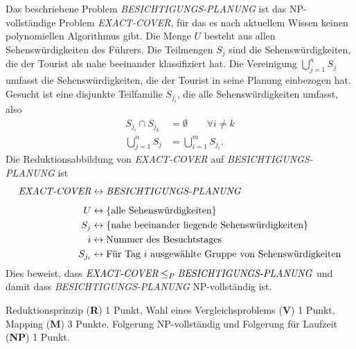 \begin{loesung}
Das beschriebene Problem {\em BESICHTIGUNGS-PLANUNG}
ist das NP-vollständige Problem {\em EXACT-COVER}, 
für das es nach aktuellem Wissen keinen polynomiellen Algorithmus gibt.
Die Menge $U$ besteht aus allen Sehenswürdigkeiten des Führers.
Die Teilmengen $S_j$ sind die Sehenswürdigkeiten, die der Tourist 
als nahe beeinander klassifiziert hat.
Die Vereinigung $\bigcup_{j=1}^n S_j$ umfasst die Sehenswürdigkeiten, die
der Tourist in seine Planung einbezogen hat.
Gesucht ist eine disjunkte Teilfamilie $S_{j_i}$, die alle Sehenswürdigkeiten
umfasst, also
\begin{align*}
S_{j_i}\cap S_{j_k}&=\emptyset \qquad \forall i\ne k
\\
\bigcup_{j=1}^n S_j &= \bigcup_{i=1}^m S_{j_i}.
\end{align*}
Die Reduktionsabbildung von {\em EXACT-COVER} auf 
{\em BESICHTIGUNGS-PLANUNG} ist
\begin{align*}
\text{\em EXACT-COVER}
&\leftrightarrow
\text{\em BESICHTIGUNGS-PLANUNG}
\\[5pt]
U&\leftrightarrow\{\text{alle Sehenswürdigkeiten}\}
\\
S_j&\leftrightarrow\{\text{nahe beeinander liegende Sehenswürdigkeiten}\}
\\
i&\leftrightarrow\text{Nummer des Besuchtstages}
\\
S_{j_i}&\leftrightarrow\text{Für Tag $i$ ausgewählte Gruppe von Sehenswürdigkeiten}
\end{align*}
Dies beweist, dass
$\text{\em EXACT-COVER}\le_{P}\text{\em BESICHTIGUNGS-PLANUNG}$
und damit dass {\em BESICHTIGUNGS-PLANUNG} NP-vollständig ist.
\end{loesung}

\begin{bewertung}
Reduktionsprinzip ({\bf R}) 1 Punkt,
Wahl eines Vergleichsproblems ({\bf V}) 1 Punkt,
Mapping ({\bf M}) 3 Punkte.
Folgerung NP-vollständig und Folgerung für Laufzeit ({\bf NP}) 1 Punkt.
\end{bewertung}


